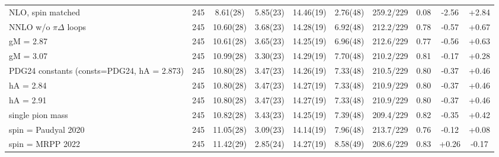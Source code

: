 \begin{tabular}{lccccccccc}
NLO, spin matched & 245 & 8.61(28) & 5.85(23) & 14.46(19) & 2.76(48) & 259.2/229 & 0.08 & -2.56 & +2.84 \\
NNLO w/o $\pi\Delta$ loops & 245 & 10.60(28) & 3.68(23) & 14.28(19) & 6.92(48) & 212.2/229 & 0.78 & -0.57 & +0.67 \\
gM = 2.87 & 245 & 10.61(28) & 3.65(23) & 14.25(19) & 6.96(48) & 212.6/229 & 0.77 & -0.56 & +0.63 \\
gM = 3.07 & 245 & 10.99(28) & 3.30(23) & 14.29(19) & 7.70(48) & 210.2/229 & 0.81 & -0.17 & +0.28 \\
PDG24 constants (consts=PDG24, hA = 2.873) & 245 & 10.80(28) & 3.47(23) & 14.26(19) & 7.33(48) & 210.5/229 & 0.80 & -0.37 & +0.46 \\
hA = 2.84 & 245 & 10.80(28) & 3.47(23) & 14.27(19) & 7.33(48) & 210.9/229 & 0.80 & -0.37 & +0.46 \\
hA = 2.91 & 245 & 10.80(28) & 3.47(23) & 14.27(19) & 7.33(48) & 210.9/229 & 0.80 & -0.37 & +0.46 \\
single pion mass & 245 & 10.82(28) & 3.43(23) & 14.25(19) & 7.39(48) & 209.4/229 & 0.82 & -0.35 & +0.42 \\
spin = Paudyal 2020 & 245 & 11.05(28) & 3.09(23) & 14.14(19) & 7.96(48) & 213.7/229 & 0.76 & -0.12 & +0.08 \\
spin = MRPP 2022 & 245 & 11.42(29) & 2.85(24) & 14.27(19) & 8.58(49) & 208.6/229 & 0.83 & +0.26 & -0.17 \\
\hline
\end{tabular}

